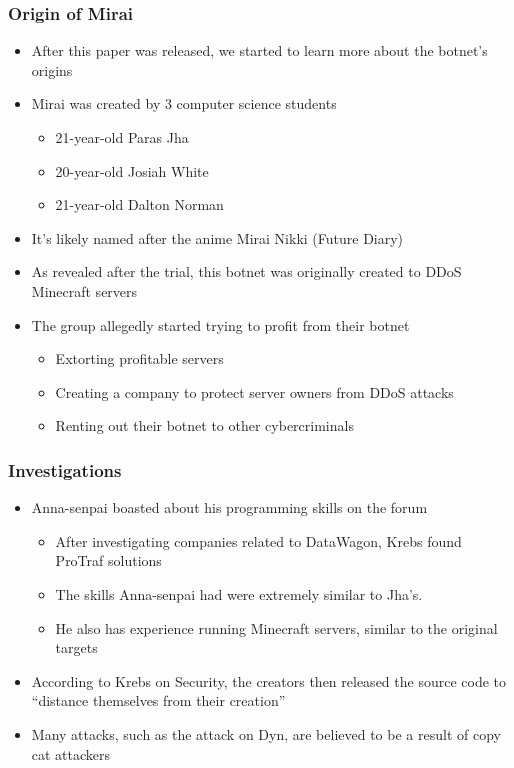 \documentclass{beamer}
\begin{document}
\begin{frame}
	\frametitle{Origin of Mirai}
	\begin{itemize}
		\item<+-> After this paper was released, we started to learn more about the botnet's origins
		\item<+-> Mirai was created by 3 computer science students
		\begin{itemize}
			\item<+-> 21-year-old Paras Jha
			\item<+-> 20-year-old Josiah White
			\item<+-> 21-year-old Dalton Norman
		\end{itemize}
		\item<+-> It's likely named after the anime Mirai Nikki (Future Diary)
		\item<+-> As revealed after the trial, this botnet was originally created to DDoS Minecraft servers
		\item<+-> The group allegedly started trying to profit from their botnet
		\begin{itemize}
			\item<+-> Extorting profitable servers
			\item<+-> Creating a company to protect server owners from DDoS attacks
			\item<+-> Renting out their botnet to other cybercriminals
		\end{itemize}
	\end{itemize}
\end{frame}

\begin{frame}
	\frametitle{Investigations}
	\begin{itemize}
		\item<+-> Anna-senpai boasted about his programming skills on the forum
		\begin{itemize}
			\item<+-> After investigating companies related to DataWagon, Krebs found ProTraf solutions
			\item<+-> The skills Anna-senpai had were extremely similar to Jha's.
			\item<+-> He also has experience running Minecraft servers, similar to the original targets
		\end{itemize}
		\item<+-> According to Krebs on Security, the creators then released the source code to ``distance themselves from their creation''
		\item<+-> Many attacks, such as the attack on Dyn, are believed to be a result of copy cat attackers
	\end{itemize}
\end{frame}
\end{document}
